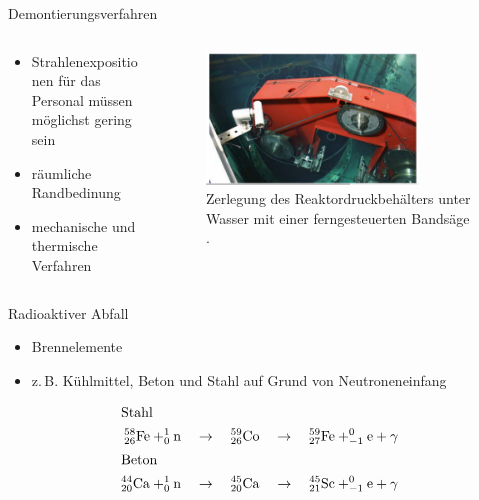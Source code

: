 \begin{frame}{Demontierungsverfahren}
  \begin{columns}

    \begin{column}{0.48\textwidth}
    \begin{itemize}
      \setlength\itemsep{1.2em}
      \item{Strahlenexpositionen für das Personal müssen möglichst gering sein }
      \item{ räumliche Randbedinung }
      \item{ mechanische und thermische Verfahren }

    \end{itemize}

    \end{column}

    \begin{column}{0.48\textwidth}
      \begin{figure}
         \centering
         \includegraphics[width=0.8\textwidth]{./bilder/zerlegung_bandsaege.PNG}
         \caption{Zerlegung des Reaktordruckbehälters unter Wasser mit einer ferngesteuerten Bandsäge \cite{stilllegung_grs}. }
         \label{ fig: abbau_roboter}
       \end{figure}
    \end{column}

  \end{columns}
\end{frame}



\begin{frame}{Radioaktiver Abfall}
  \begin{itemize}
    \setlength\itemsep{1.2em}
    \item{Brennelemente}
    \item{z.\,B. Kühlmittel, Beton und Stahl auf Grund von Neutroneneinfang}
  \end{itemize}
  \begin{align*}
    \shortintertext{Stahl}
    ^{58}_{26}\ce{Fe}+ ^1_0\mathrm{n }\quad &\rightarrow \quad  ^{59}_{26}\ce{Co} \quad \rightarrow \quad ^{59}_{27}\ce{Fe} + _{-1}^{0}\ce{e}+\gamma \\
  \shortintertext{Beton}
    ^{44}_{20}\ce{Ca}+ ^1_0\mathrm{n }\quad &\rightarrow \quad  ^{45}_{20}\ce{Ca} \quad \rightarrow \quad ^{45}_{21}\ce{Sc} + _{-1}^{0}\ce{e}+\gamma
  \end{align*}
\end{frame}




